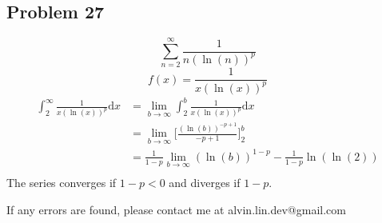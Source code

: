 \documentclass[letterpaper, 12pt]{article}
\newcommand*{\diff}{\mathrm{d}}
\begin{document}
\subsection*{Problem 27}
\[ \sum_{n=2}^{\infty}\frac{1}{n(\ln(n))^{p}} \]
\[ f(x) = \frac{1}{x(\ln(x))^{p}} \]
\begin{align*}
  \int_{2}^{\infty}\frac{1}{x(\ln(x))^{p}}\diff{x} &=
    \lim_{b\to\infty}\int_{2}^{b}\frac{1}{x(\ln(x))^{p}}\diff{x} \\
  &= \lim_{b\to\infty}\bigg[\frac{(\ln(b))^{-p+1}}{-p+1}\bigg]_{2}^{b} \\
  &= \frac{1}{1-p}\lim_{b\to\infty}(\ln(b))^{1-p}-\frac{1}{1-p}\ln(\ln(2)) \\
\end{align*}
The series converges if \( 1-p < 0 \) and diverges if \( 1 - p \).

\begin{center}
  If any errors are found, please contact me at alvin.lin.dev@gmail.com
\end{center}
\end{document}
